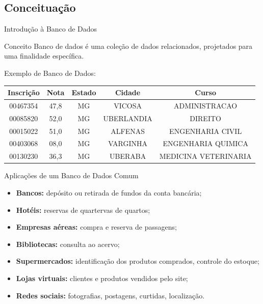 	\subsection{Conceituação}
		\begin{frame}{Introdução à Banco de Dados}
			\begin{block}{Conceito}
				Banco de dados é uma coleção de dados relacionados, projetados para uma finalidade específica.
			\end{block}
				\pause
				\bigskip
			Exemplo de Banco de Dados:
			\begin{table}
				\centering
				\begin{tabular}{c|c|c|c|c}
					\hline 
					\textbf{Inscrição} & \textbf{Nota} & \textbf{Estado} & \textbf{Cidade}     & \textbf{Curso}                \\\hline \hline 
					00467354  & 47,8 & MG     & VICOSA     & ADMINISTRACAO        \\\hline 
					00085820  & 52,0 & MG     & UBERLANDIA & DIREITO              \\\hline 
					00015022  & 51,0 & MG     & ALFENAS    & ENGENHARIA CIVIL     \\\hline 
					00403068  & 08,0 & MG     & VARGINHA   & ENGENHARIA QUIMICA   \\\hline 
					00130230  & 36,3 & MG     & UBERABA    & MEDICINA VETERINARIA \\\hline 
				\end{tabular}
			\end{table}
		\end{frame}

		\begin{frame}{Aplicações de um Banco de Dados Comum}
			\begin{itemize}
				\setlength{\itemsep}{1em}
				\item \textbf{Bancos:} depósito ou retirada de fundos da conta bancária;
				\item \textbf{Hotéis:} reservas de quartervas de quartos;
				\item \textbf{Empresas aéreas:} compra e reserva de passagens;
				\item \textbf{Bibliotecas:} consulta ao acervo;
				\item \textbf{Supermercados:} identificação dos produtos comprados, controle do estoque;
				\item \textbf{Lojas virtuais:} clientes e produtos vendidos pelo site;
				\item \textbf{Redes sociais:} fotografias, postagens, curtidas, localização.
			\end{itemize}
		\end{frame}

